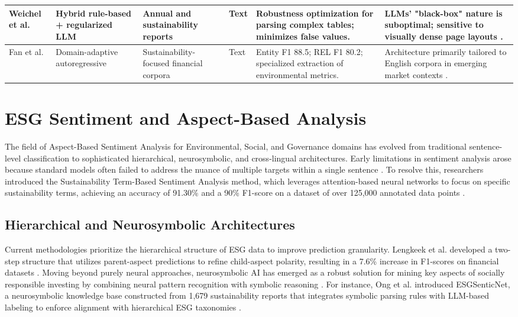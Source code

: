 \begin{landscape}
\begin{table}[p]
\begin{tabularx}{\linewidth}{|p{1.8cm}|X|X|p{1.8cm}|X|X|}
Weichel et al.  \parencite{hendrik_weichel_5ea70935} & Hybrid rule-based + regularized LLM & Annual and sustainability reports & Text & Robustness optimization for parsing complex tables; minimizes false values. & LLMs' "black-box" nature is suboptimal; sensitive to visually dense page layouts  \parencite{hendrik_weichel_5ea70935}. \\ \hline
Fan et al.  \parencite{j__h__fan_97bd591d} & Domain-adaptive autoregressive & Sustainability-focused financial corpora & Text & Entity F1 88.5; REL F1 80.2; specialized extraction of environmental metrics. & Architecture primarily tailored to English corpora in emerging market contexts  \parencite{j__h__fan_97bd591d}. \\ \hline
\end{tabularx}
\end{table}
\end{landscape}

\section{ESG Sentiment and Aspect-Based Analysis}

The field of Aspect-Based Sentiment Analysis for Environmental, Social, and Governance domains has evolved from traditional sentence-level classification to sophisticated hierarchical, neurosymbolic, and cross-lingual architectures. Early limitations in sentiment analysis arose because standard models often failed to address the nuance of multiple targets within a single sentence  \parencite{blaise_sandwidi_c58b16e0}. To resolve this, researchers introduced the Sustainability Term-Based Sentiment Analysis method, which leverages attention-based neural networks to focus on specific sustainability terms, achieving an accuracy of 91.30\% and a 90\% F1-score on a dataset of over 125,000 annotated data points  \parencite{blaise_sandwidi_c58b16e0}.
\subsection{Hierarchical and Neurosymbolic Architectures}

Current methodologies prioritize the hierarchical structure of ESG data to improve prediction granularity. Lengkeek et al.  \parencite{matteo_lengkeek_5d9f2a4e} developed a two-step structure that utilizes parent-aspect predictions to refine child-aspect polarity, resulting in a 7.6\% increase in F1-scores on financial datasets  \parencite{matteo_lengkeek_5d9f2a4e}. Moving beyond purely neural approaches, neurosymbolic AI has emerged as a robust solution for mining key aspects of socially responsible investing by combining neural pattern recognition with symbolic reasoning  \parencite{wihan_van_der_heever_5ff35709}. For instance, Ong et al.  \parencite{keane_ong_8fec4760} introduced ESGSenticNet, a neurosymbolic knowledge base constructed from 1,679 sustainability reports that integrates symbolic parsing rules with LLM-based labeling to enforce alignment with hierarchical ESG taxonomies  \parencite{keane_ong_8fec4760}.

